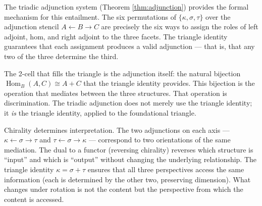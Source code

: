 \begin{remark}
The triadic adjunction system (Theorem \ref{thm:adjunction})
provides the formal mechanism for this entailment. The six
permutations of $\{\kappa, \sigma, \tau\}$ over the
adjunction stencil $A \leftarrow B \to C$ are precisely
the six ways to assign the roles of left adjoint, hom, and
right adjoint to the three facets. The triangle identity
guarantees that each assignment produces a valid adjunction
--- that is, that any two of the three determine the third.

The 2-cell that fills the triangle is the adjunction itself:
the natural bijection $\operatorname{Hom}_B(A, C) \cong
A + C$ that the triangle identity provides. This bijection
is the operation that mediates between the three structures.
That operation is discrimination. The triadic adjunction
does not merely use the triangle identity; it \emph{is}
the triangle identity, applied to the foundational triangle.

Chirality determines interpretation. The two adjunctions on
each axis --- $\kappa \leftarrow \sigma \to \tau$ and
$\tau \leftarrow \sigma \to \kappa$ --- correspond to two
orientations of the same mediation. The dual to a functor
(reversing chirality) reverses which structure is ``input''
and which is ``output'' without changing the underlying
relationship. The triangle identity
$\kappa = \sigma + \tau$ ensures that all three
perspectives access the same information (each is
determined by the other two, preserving dimension).
What changes under rotation is not the content but the
perspective from which the content is accessed.
\end{remark}

